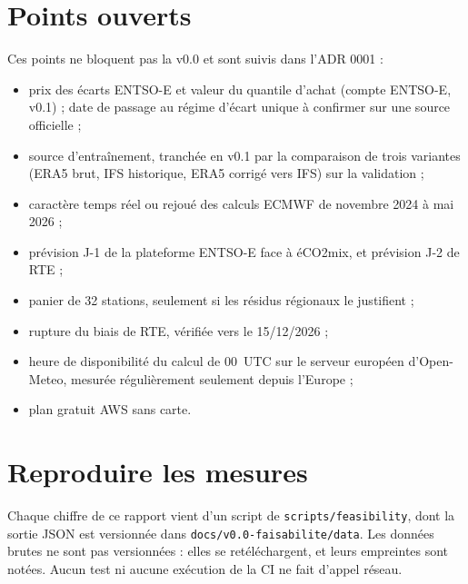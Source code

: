 \documentclass[11pt,a4paper]{article}
\begin{document}

\section{Points ouverts}

Ces points ne bloquent pas la v0.0 et sont suivis dans l'ADR 0001 :

\begin{itemize}
  \item prix des écarts ENTSO-E et valeur du quantile d'achat (compte ENTSO-E, v0.1) ; date de passage au régime d'écart unique à confirmer sur une source officielle ;
  \item source d'entraînement, tranchée en v0.1 par la comparaison de trois variantes (ERA5 brut, IFS historique, ERA5 corrigé vers IFS) sur la validation ;
  \item caractère temps réel ou rejoué des calculs ECMWF de novembre 2024 à mai 2026 ;
  \item prévision J-1 de la plateforme ENTSO-E face à éCO2mix, et prévision J-2 de RTE ;
  \item panier de 32 stations, seulement si les résidus régionaux le justifient ;
  \item rupture du biais de RTE, vérifiée vers le 15/12/2026 ;
  \item heure de disponibilité du calcul de 00~UTC sur le serveur européen d'Open-Meteo, mesurée régulièrement seulement depuis l'Europe ;
  \item plan gratuit AWS sans carte.
\end{itemize}

\section*{Reproduire les mesures}

Chaque chiffre de ce rapport vient d'un script de \nolinkurl{scripts/feasibility}, dont la sortie JSON est versionnée dans \nolinkurl{docs/v0.0-faisabilite/data}. Les données brutes ne sont pas versionnées : elles se retéléchargent, et leurs empreintes sont notées. Aucun test ni aucune exécution de la CI ne fait d'appel réseau.
\end{document}
